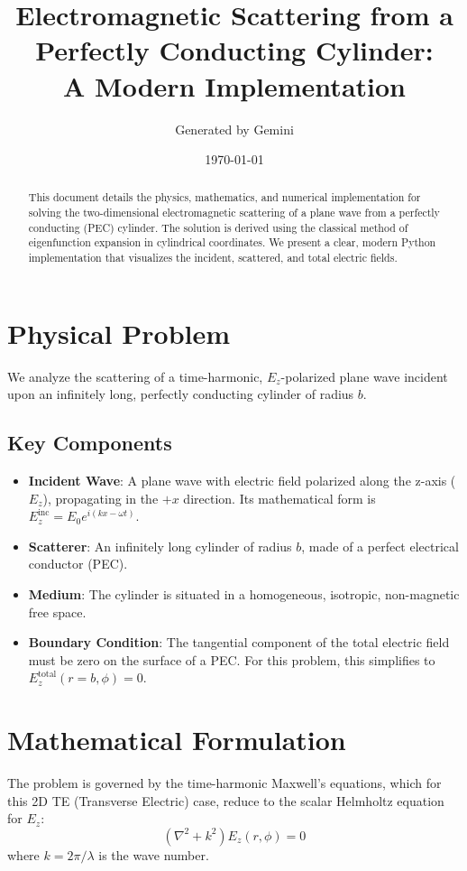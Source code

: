 \documentclass[11pt,a4paper]{article}
\title{Electromagnetic Scattering from a Perfectly Conducting Cylinder: \\ A Modern Implementation}
\author{Generated by Gemini}
\date{\today}
\begin{document}
\maketitle

\begin{abstract}
This document details the physics, mathematics, and numerical implementation for solving the two-dimensional electromagnetic scattering of a plane wave from a perfectly conducting (PEC) cylinder. The solution is derived using the classical method of eigenfunction expansion in cylindrical coordinates. We present a clear, modern Python implementation that visualizes the incident, scattered, and total electric fields.
\end{abstract}

\section{Physical Problem}

We analyze the scattering of a time-harmonic, $E_z$-polarized plane wave incident upon an infinitely long, perfectly conducting cylinder of radius $b$.

\subsection{Key Components}
\begin{itemize}
    \item \textbf{Incident Wave}: A plane wave with electric field polarized along the z-axis ($E_z$), propagating in the $+x$ direction. Its mathematical form is $E_z^{\text{inc}} = E_0 e^{i(kx - \omega t)}$.
    \item \textbf{Scatterer}: An infinitely long cylinder of radius $b$, made of a perfect electrical conductor (PEC).
    \item \textbf{Medium}: The cylinder is situated in a homogeneous, isotropic, non-magnetic free space.
    \item \textbf{Boundary Condition}: The tangential component of the total electric field must be zero on the surface of a PEC. For this problem, this simplifies to $E_z^{\text{total}}(r=b, \phi) = 0$.
\end{itemize}

\section{Mathematical Formulation}

The problem is governed by the time-harmonic Maxwell's equations, which for this 2D TE (Transverse Electric) case, reduce to the scalar Helmholtz equation for $E_z$:
\begin{equation}
    (\nabla^2 + k^2) E_z(r, \phi) = 0
\end{equation}
where $k = 2\pi/\lambda$ is the wave number.
\end{document}

